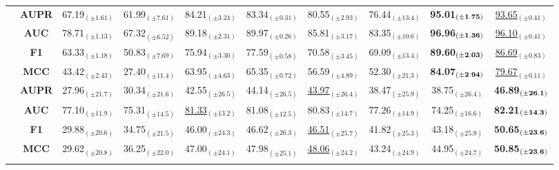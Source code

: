 \begin{table}[t]
\begin{tabular*}{\textwidth}{@{\extracolsep{\fill}} l |c | ccccccc | >{\columncolor{FireBrick!40}}c }
\addlinespace    
\cmidrule{1-10}

\multirow{4}{*}{\bf XC} & \bf AUPR & 67.19$_{(\pm1.61)}$ & 61.99$_{(\pm7.61)}$ & 84.21$_{(\pm3.24)}$ & 83.34$_{(\pm0.31)}$ & 80.55$_{(\pm2.93)}$ & 76.44$_{(\pm13.4)}$ & \bf 95.01$_{(\bf\pm1.75)}$ & \underline{93.65$_{(\pm0.41)}$} \\
& \bf AUC & 78.71$_{(\pm1.13)}$ & 67.32$_{(\pm6.52)}$ & 89.18$_{(\pm2.31)}$ & 89.97$_{(\pm0.26)}$ & 85.81$_{(\pm3.17)}$ & 83.35$_{(\pm10.6)}$ & \bf 96.96$_{(\bf\pm1.36)}$ & \underline{96.10$_{(\pm0.41)}$} \\
 & \bf F1 & 63.33$_{(\pm1.18)}$ & 50.83$_{(\pm7.69)}$ & 75.94$_{(\pm3.30)}$ & 77.59$_{(\pm0.58)}$ & 70.58$_{(\pm3.45)}$ & 69.09$_{(\pm13.4)}$ & \bf 89.60$_{(\bf\pm2.03)}$ & \underline{86.69$_{(\pm0.83)}$} \\
 & \bf MCC  & 43.42$_{(\pm2.43)}$ & 27.40$_{(\pm11.4)}$ & 63.95$_{(\pm4.63)}$ & 65.35$_{(\pm0.72)}$ & 56.59$_{(\pm4.89)}$ & 52.30$_{(\pm21.3)}$ & \bf 84.07$_{(\bf\pm2.94)}$ & \underline{79.67$_{(\pm0.11)}$} \\


\addlinespace    
\cmidrule{1-10}

 \multirow{4}{*}{\bf SMD} & \bf AUPR & 27.96$_{(\pm21.7)}$ & 30.34$_{(\pm21.6)}$ & 42.55$_{(\pm26.5)}$ & 44.14$_{(\pm26.5)}$ & \underline{43.97$_{(\pm26.4)}$} & 38.47$_{(\pm25.9)}$ & 38.75$_{(\pm26.4)}$ & \bf 46.89$_{(\bf\pm26.1)}$ \\
 & \bf AUC & 77.10$_{(\pm11.9)}$ & 75.31$_{(\pm14.5)}$ & \underline{81.33$_{(\pm13.2)}$} & 81.08$_{(\pm12.5)}$ & 80.83$_{(\pm14.7)}$ & 77.26$_{(\pm14.9)}$ & 74.25$_{(\pm16.6)}$ & \bf 82.21$_{(\bf\pm14.3)}$ \\
 & \bf F1 & 29.88$_{(\pm20.6)}$ & 34.75$_{(\pm21.5)}$ & 46.00$_{(\pm24.3)}$ & 46.62$_{(\pm26.3)}$ & \underline{46.51$_{(\pm25.7)}$} & 41.82$_{(\pm25.3)}$ & 43.18$_{(\pm25.9)}$ & \bf 50.65$_{(\bf\pm23.6)}$ \\
 & \bf MCC & 29.62$_{(\pm20.8)}$ & 36.25$_{(\pm22.0)}$ & 47.00$_{(\pm24.1)}$ & 47.98$_{(\pm25.1)}$ & \underline{48.06$_{(\pm24.2)}$} & 43.24$_{(\pm24.9)}$ & 44.95$_{(\pm24.7)}$ & \bf 50.85$_{(\bf\pm23.6)}$ \\
\addlinespace    
\cmidrule{1-10}


\end{tabular*}
\end{table}
